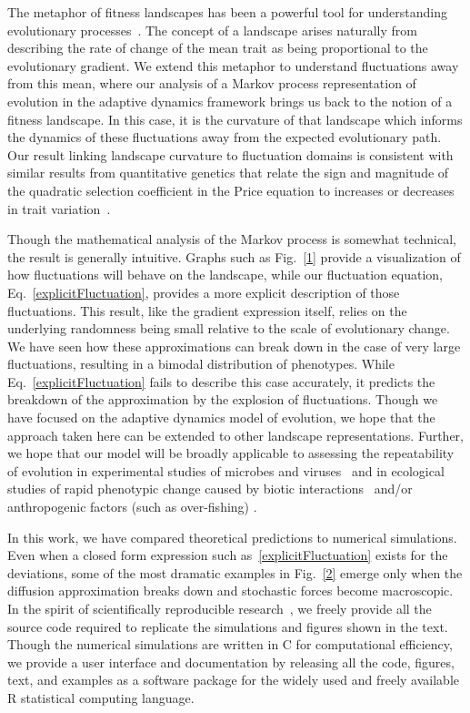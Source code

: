 The metaphor of fitness landscapes has been a powerful tool for understanding evolutionary processes~\citep{wright1932,Lande79,Abrams93,dieckmann_jmb1996}.  The concept of a landscape arises naturally from describing the rate of change of the mean trait as being proportional to the evolutionary gradient.  We extend this metaphor to understand fluctuations away from this mean, where our analysis of a Markov process representation of evolution in the adaptive dynamics framework brings us back to the notion of a fitness landscape.  In this case, it is the curvature of that landscape which informs the dynamics of these fluctuations away from the expected evolutionary path.  Our result linking landscape curvature to fluctuation domains is consistent with similar results from quantitative genetics that relate the sign and magnitude of the quadratic selection coefficient in the Price equation to increases or decreases in trait variation~\citep{lande_1983,chevin_gen2008}.
 
Though the mathematical analysis of the Markov process is somewhat technical, the result is generally intuitive.  Graphs such as Fig.~\ref{1} provide a visualization of how fluctuations will behave on the landscape, while our fluctuation equation, Eq.~\eqref{explicitFluctuation}, provides a more explicit description of those fluctuations.  This result, like the gradient expression itself, relies on the underlying randomness being small relative to the scale of evolutionary change.  We have seen how these approximations can break down in the case of very large fluctuations, resulting in a bimodal distribution of phenotypes.  While Eq.~\eqref{explicitFluctuation} fails to describe this case accurately, it predicts the breakdown of the approximation by the explosion of fluctuations.  Though we have focused on the adaptive dynamics model of evolution, we hope that the approach taken here can be extended to other landscape representations.  Further, we hope that our model will be broadly applicable to assessing the repeatability of evolution in experimental studies of microbes and viruses~\citep{wichman_sci1999,cooper_pnas2003} and in ecological studies of rapid phenotypic change caused by biotic interactions~\citep{duffy_ecolett2007} and/or anthropogenic factors (such as over-fishing) \citep{olsen_2005}.
 
In this work, we have compared theoretical predictions
to numerical simulations.  Even when a closed form expression such as~\eqref{explicitFluctuation} exists for the deviations, some of the most dramatic examples in Fig.~\ref{2} emerge only when the diffusion approximation breaks down and stochastic forces become macroscopic.  In the spirit of scientifically reproducible research~\citep{TempleLang07, Claerbout, Stodden}, we freely provide all the source code required to replicate the simulations and figures shown in the text.  Though the numerical simulations are written in C for computational efficiency, we provide a user interface and documentation by releasing all the code, figures, text, and examples as a software package for the widely used and freely available R statistical computing language.  
 
